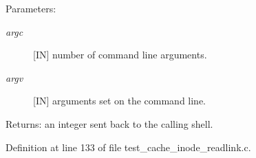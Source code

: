 \begin{Desc}
\item[Parameters:]
\begin{description}
\item[{\em argc}][IN] number of command line arguments. \item[{\em argv}][IN] arguments set on the command line.\end{description}
\end{Desc}
\begin{Desc}
\item[Returns:]an integer sent back to the calling shell. \end{Desc}


Definition at line 133 of file test\_\-cache\_\-inode\_\-readlink.c.